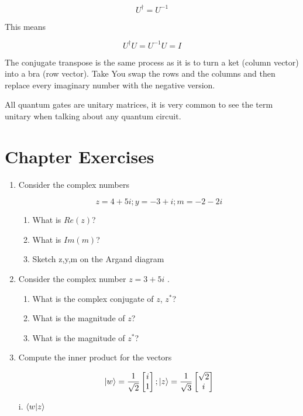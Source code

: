 $$ U^\dagger = U^{-1} $$

This means 

$$ U^\dagger U = U^{-1}U = I $$

The conjugate transpose is the same process as it is to turn a ket (column vector) into a bra (row vector). Take You swap the rows and the columns and then replace every imaginary number with the negative version. 

All quantum gates are unitary matrices, it is very common to see the term unitary when talking about any quantum circuit. 

\section{Chapter Exercises}
\begin{enumerate}
    \item Consider the complex numbers 

    $$ z = 4 + 5i ; y = -3 + i; m = -2 - 2i $$
    \begin{enumerate}[i]
        \item What is $Re(z)$? 
        \item What is $Im(m)$? 
        \item Sketch z,y,m on the Argand diagram
    \end{enumerate}

    \item Consider the complex number $z = 3 + 5i$ . 
        \begin{enumerate}[i]
            \item What is the complex conjugate of $z$, $z^*$?
            \item What is the magnitude of $z$?
            \item What is the magnitude of $z^*$?
        \end{enumerate}

    \item Compute the inner product for the vectors 

        $$ \ket{w} = \frac{1}{\sqrt{2}} \begin{bmatrix} i \\ 1 \end{bmatrix} ; \ket{z} = \frac{1}{\sqrt{3}} \begin{bmatrix} \sqrt{2} \\ i \end{bmatrix}$$

        i. $\braket{w|z}$


\end{enumerate}
